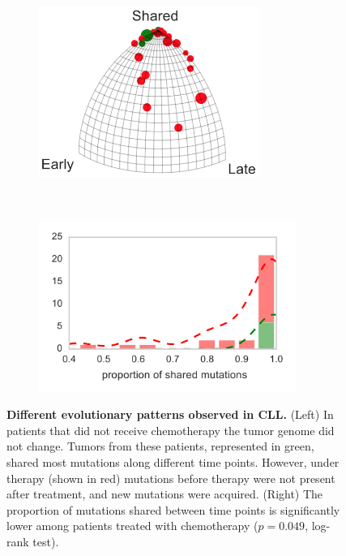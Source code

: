 \documentclass[a4paper,11pt]{article}
\begin{document}
\begin{figure}
    \begin{subfigure}{0.5\linewidth}
    \centering
    \includegraphics[height=2.2in]{../figures/CLL_triplet.png}
    \end{subfigure}
    ~
    \begin{subfigure}{0.5\linewidth}
    \centering
    \includegraphics[height=2.2in]{../figures/CLL_histogram.pdf}
    \end{subfigure}

    \caption{{\bf Different evolutionary patterns observed in CLL.} (Left) In patients that did not receive chemotherapy the tumor genome did not change. Tumors from these patients, represented in green, shared most mutations along different time points. However, under therapy (shown in red) mutations before therapy were not present after treatment, and new mutations were acquired. (Right) The proportion of mutations shared between time points is significantly lower among patients treated with chemotherapy ($p = 0.049$, log-rank test).}
    \label{fig:chemoCLL}
\end{figure}
\end{document}
